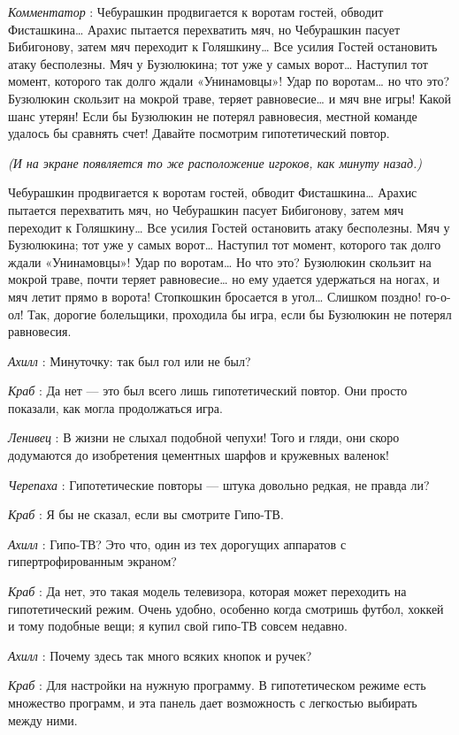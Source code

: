 \documentclass[../main.tex]{subfiles}
\begin{document}
\begin{dialogue}
\emph{Комментатор} : Чебурашкин продвигается к воротам гостей, обводит Фисташкина\ldots{} Арахис пытается перехватить мяч, но Чебурашкин пасует Бибигонову, затем мяч переходит к Голяшкину\ldots{} Все усилия Гостей остановить атаку бесполезны. Мяч у Бузюлюкина; тот уже у самых ворот\ldots{} Наступил тот момент, которого так долго ждали «Унинамовцы»! Удар по воротам\ldots{} но что это? Бузюлюкин скользит на мокрой траве, теряет равновесие\ldots{} и мяч вне игры! Какой шанс утерян! Если бы Бузюлюкин не потерял равновесия, местной команде удалось бы сравнять счет! Давайте посмотрим гипотетический повтор.

\emph{(И на экране появляется то же расположение игроков, как минуту назад.)}

Чебурашкин продвигается к воротам гостей, обводит Фисташкина\ldots{} Арахис пытается перехватить мяч, но Чебурашкин пасует Бибигонову, затем мяч переходит к Голяшкину\ldots{} Все усилия Гостей остановить атаку бесполезны. Мяч у Бузюлюкина; тот уже у самых ворот\ldots{} Наступил тот момент, которого так долго ждали «Унинамовцы»! Удар по воротам\ldots{} Но что это? Бузюлюкин скользит на мокрой траве, почти теряет равновесие\ldots{} но ему удается удержаться на ногах, и мяч летит прямо в ворота! Стопкошкин бросается в угол\ldots{} Слишком поздно! го-о-ол! Так, дорогие болельщики, проходила бы игра, если бы Бузюлюкин не потерял равновесия.

\emph{Ахилл} : Минуточку: так был гол или не был?

\emph{Краб} : Да нет --- это был всего лишь гипотетический повтор. Они просто показали, как могла продолжаться игра.

\emph{Ленивец} : В жизни не слыхал подобной чепухи! Того и гляди, они скоро додумаются до изобретения цементных шарфов и кружевных валенок!

\emph{Черепаха} : Гипотетические повторы --- штука довольно редкая, не правда ли?

\emph{Краб} : Я бы не сказал, если вы смотрите Гипо-ТВ.

\emph{Ахилл} : Гипо-ТВ? Это что, один из тех дорогущих аппаратов с гипертрофированным экраном?

\emph{Краб} : Да нет, это такая модель телевизора, которая может переходить на гипотетический режим. Очень удобно, особенно когда смотришь футбол, хоккей и тому подобные вещи; я купил свой гипо-ТВ совсем недавно.

\emph{Ахилл} : Почему здесь так много всяких кнопок и ручек?

\emph{Краб} : Для настройки на нужную программу. В гипотетическом режиме есть множество программ, и эта панель дает возможность с легкостью выбирать между ними.


\end{dialogue}
\end{document}
